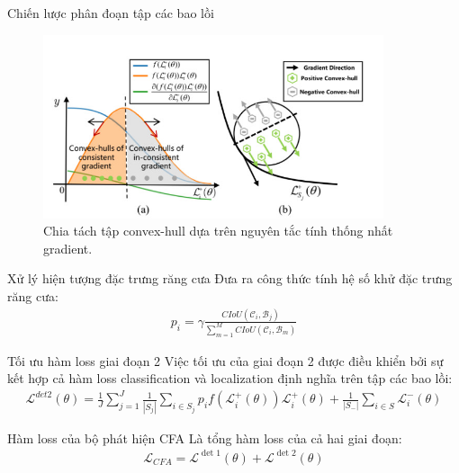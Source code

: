 \documentclass[11pt]{beamer}
\theoremstyle{definition}
\theoremstyle{plain}
\theoremstyle{plain}
\theoremstyle{remark}
\begin{document}
	
	\begin{frame}{Chiến lược phân đoạn tập các bao lồi}
		
		\begin{figure}[ht!]
			\begin{center}
				\includegraphics[width=10cm]{./Hinh_9.jpg}
				\caption{Chia tách tập convex-hull dựa trên nguyên tắc tính thống nhất gradient.}
				\label{upper_convex_function}
			\end{center}
		\end{figure}
		
	\end{frame}
	\begin{frame}{Xử lý hiện tượng đặc trưng răng cưa}
		Đưa ra công thức tính hệ số khử đặc trưng răng cưa:
		\begin{align} \label{ptdd8}
			p_i = \gamma \frac{CIoU (\mathcal{C}_i, \mathcal{B}_j)}{\sum_{m=1}^{M} CIoU (\mathcal{C}_i, \mathcal{B}_m)}
		\end{align}
	
		
		
	\end{frame}
	\begin{frame}{Tối ưu hàm loss giai đoạn 2}
		Việc tối ưu của giai đoạn 2 được điều khiển bởi sự kết hợp cả hàm loss classification và localization định nghĩa trên tập các bao lồi:\\
		\begin{align} \label{ptdd10}
			\mathcal{L}^{det2} (\theta) = \frac{1}{J} \sum_{j=1}^{J} \frac{1}{|S_j|} \sum_{i \in {S_j}} p_i f(\mathcal{L}_i^+(\theta)) \mathcal{L}_i^{+}(\theta)  + \frac{1}{|S_-|} \sum_{i \in S} \mathcal{L}_i^- (\theta) 
		\end{align}
	\end{frame}
	\begin{frame}{Hàm loss của bộ phát hiện CFA}
		Là tổng hàm loss của cả hai giai đoạn:
		\begin{align}
			\mathcal{L}_{CFA} = \mathcal{L}^{\operatorname{det} 1}(\theta)+\mathcal{L}^{\operatorname{det} 2}(\theta)
		\end{align}
		
	\end{frame}
	
\end{document}
